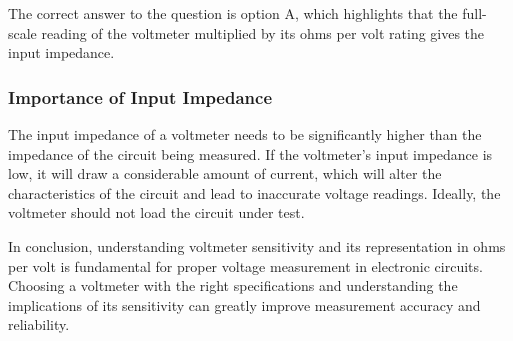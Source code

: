 The correct answer to the question is option A, which highlights that the full-scale reading of the voltmeter multiplied by its ohms per volt rating gives the input impedance.

\subsubsection{Importance of Input Impedance}

The input impedance of a voltmeter needs to be significantly higher than the impedance of the circuit being measured. If the voltmeter's input impedance is low, it will draw a considerable amount of current, which will alter the characteristics of the circuit and lead to inaccurate voltage readings. Ideally, the voltmeter should not load the circuit under test.

\begin{center}
\end{center}

In conclusion, understanding voltmeter sensitivity and its representation in ohms per volt is fundamental for proper voltage measurement in electronic circuits. Choosing a voltmeter with the right specifications and understanding the implications of its sensitivity can greatly improve measurement accuracy and reliability. 
